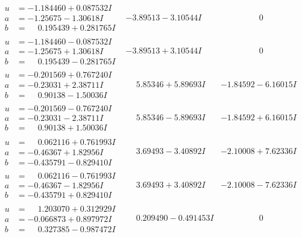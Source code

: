 \documentclass[1p]{elsarticle_modified}
\theoremstyle{definition}
\begin{document}
$$\begin{array}{c|c|c}
\begin{aligned}
u &= -1.184460 + 0.087532 I \\
a &= -1.25675 - 1.30618 I \\
b &= \phantom{-}0.195439 + 0.281765 I\end{aligned}
 & -3.89513 - 3.10544 I & \phantom{-0.000000 } 0 \\ \hline\begin{aligned}
u &= -1.184460 - 0.087532 I \\
a &= -1.25675 + 1.30618 I \\
b &= \phantom{-}0.195439 - 0.281765 I\end{aligned}
 & -3.89513 + 3.10544 I & \phantom{-0.000000 } 0 \\ \hline\begin{aligned}
u &= -0.201569 + 0.767240 I \\
a &= -0.23031 + 2.38711 I \\
b &= \phantom{-}0.90138 - 1.50036 I\end{aligned}
 & \phantom{-}5.85346 + 5.89693 I & -1.84592 - 6.16015 I \\ \hline\begin{aligned}
u &= -0.201569 - 0.767240 I \\
a &= -0.23031 - 2.38711 I \\
b &= \phantom{-}0.90138 + 1.50036 I\end{aligned}
 & \phantom{-}5.85346 - 5.89693 I & -1.84592 + 6.16015 I \\ \hline\begin{aligned}
u &= \phantom{-}0.062116 + 0.761993 I \\
a &= -0.46367 + 1.82956 I \\
b &= -0.435791 - 0.829410 I\end{aligned}
 & \phantom{-}3.69493 - 3.40892 I & -2.10008 + 7.62336 I \\ \hline\begin{aligned}
u &= \phantom{-}0.062116 - 0.761993 I \\
a &= -0.46367 - 1.82956 I \\
b &= -0.435791 + 0.829410 I\end{aligned}
 & \phantom{-}3.69493 + 3.40892 I & -2.10008 - 7.62336 I \\ \hline\begin{aligned}
u &= \phantom{-}1.203070 + 0.312929 I \\
a &= -0.066873 + 0.897972 I \\
b &= \phantom{-}0.327385 - 0.987472 I\end{aligned}
 & \phantom{-}0.209490 - 0.491453 I & \phantom{-0.000000 } 0 \\ \hline\begin{aligned}

\end{aligned}
\end{array}$$
\end{document}
